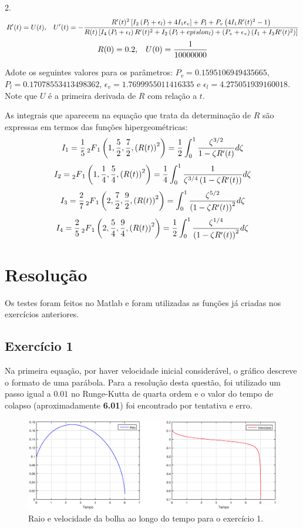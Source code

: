 \documentclass[10pt,a4paper]{article}
\newcommand{\prt}[1]{\left(#1\right)}
\newcommand{\col}[1]{\left[#1\right]}
\newcommand{\hgf}[4]{\prescript{}{2}{F}_1\left(#1,#2,#3,#4\right)}
\begin{document}
	2. \[R'(t)=U(t), \hspace{0.3cm} U'(t)=-\frac{R'(t)^2\col{I_2\prt{P_l+\epsilon_l} + 4I_1\epsilon_v}+P_l+P_v\prt{4I_1R'(t)^2-1}}{R(t)\col{I_4\prt{P_l+\epsilon_l}R'(t)^2+I_2\prt{P_l+epislon_l}+\prt{P_v+\epsilon_v}\prt{I_1+I_3R'(t)^2}}}\]
	\[R(0)=0.2, \hspace{.3cm} U(0)=\frac{1}{10000000}\]
	
	Adote os seguintes valores para os parâmetros: $P_v=0.1595106949435665$, $P_l=0.17078553413498362$, $\epsilon_v=1.7699955011416335$ e $\epsilon_l=4.275051939160018$. Note que $U$ é a primeira derivada de $R$ com relação a $t$.
	
	As integrais que aparecem na equação que trata da determinação de $R$ são expressas em termos das funções hipergeométricas:
	\[I_1=\frac{1}{5} \hgf{1}{\frac{5}{2}}{\frac{7}{2}}{\prt{R(t)}^2} = \frac{1}{2}\int_0^1{\frac{\zeta^{3/2}}{1-\zeta R'(t)}d\zeta}\]
	\[I_2=\hgf{1}{\frac{1}{4}}{\frac{5}{4}}{\prt{R(t)}^2} = \frac{1}{4}\int_0^1{\frac{1}{\zeta^{3/4}\prt{1-\zeta R'(t)}}d\zeta}\]
	\[I_3=\frac{2}{7}\hgf{2}{\frac{7}{2}}{\frac{9}{2}}{\prt{R(t)}^2} = \int_0^1{\frac{\zeta^{5/2}}{\prt{1-\zeta R'(t)}^2}d\zeta}\]
	\[I_4=\frac{2}{5}\hgf{2}{\frac{5}{4}}{\frac{9}{4}}{\prt{R(t)}^2} = \frac{1}{2}\int_0^1{\frac{\zeta^{1/4}}{\prt{1-\zeta R'(t)}^2}d\zeta}\]
	
	\newpage
	\section{Resolução}
	Os testes foram feitos no Matlab e foram utilizadas as funções já criadas nos exercícios anteriores.
	\subsection{Exercício 1}
	Na primeira equação, por haver velocidade inicial considerável, o gráfico descreve o formato de uma parábola. Para a resolução desta questão, foi utilizado um passo igual a $0.01$ no Runge-Kutta de quarta ordem e o valor do tempo de colapso (aproximadamente \textbf{6.01}) foi encontrado por tentativa e erro.
	
	\begin{figure}[h!]
    \centering
      \includegraphics[width=1\linewidth]{figures/eq1-h0-01-t-6-01.eps}
      \caption{Raio e velocidade da bolha ao longo do tempo para o exercício 1.}
      \label{fig:raio1}
	\end{figure}
	
\end{document}
